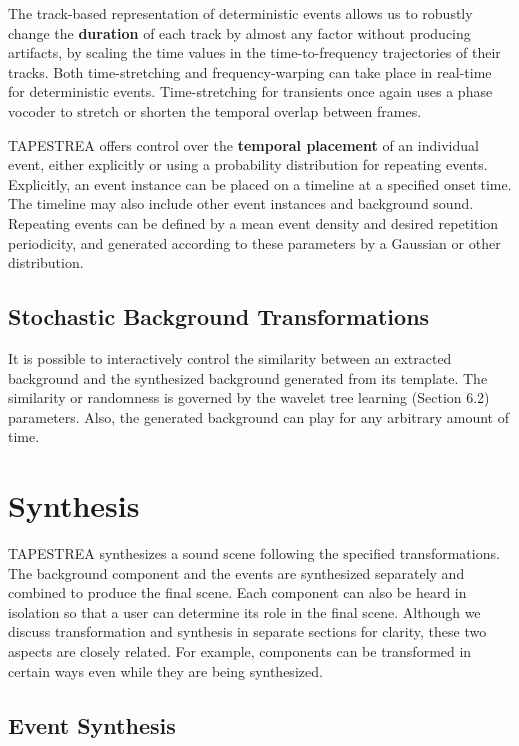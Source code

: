 \documentclass[a4paper]{article}
\begin{document}
The track-based representation of deterministic events allows us 
to robustly change the \textbf{duration} of each track by almost any factor without 
producing artifacts, by scaling the time values in the time-to-frequency trajectories of their tracks. 
Both time-stretching and frequency-warping can take place in 
real-time for deterministic events. Time-stretching for transients once again uses a phase 
vocoder to stretch or shorten the temporal overlap between frames.  

TAPESTREA offers control over the \textbf{temporal placement} of an individual event, either explicitly or using 
a probability distribution for repeating events.  
Explicitly, an event instance can be placed on a timeline at a specified onset time. The timeline 
may also include other event instances and background sound. Repeating events can be defined by a mean 
event density and desired repetition periodicity, and generated according to these parameters by a Gaussian or other 
distribution.

\subsection{Stochastic Background Transformations}

It is possible to interactively control the similarity between an extracted background 
and the synthesized background generated from its template.
The similarity or randomness is governed by the wavelet 
tree learning (Section 6.2) parameters. Also, the generated background 
can play for any arbitrary amount of time.

\section{Synthesis}

TAPESTREA synthesizes a sound scene following the specified transformations. The background 
component and the events are synthesized separately and combined to produce the 
final scene. Each component can also be heard in isolation so that a user can determine its 
role in the final scene. Although we discuss transformation and synthesis in separate sections for 
clarity, these two aspects are closely related. For example, components can be 
transformed in certain ways even while they are being synthesized. 

\subsection{Event Synthesis}
\end{document}
